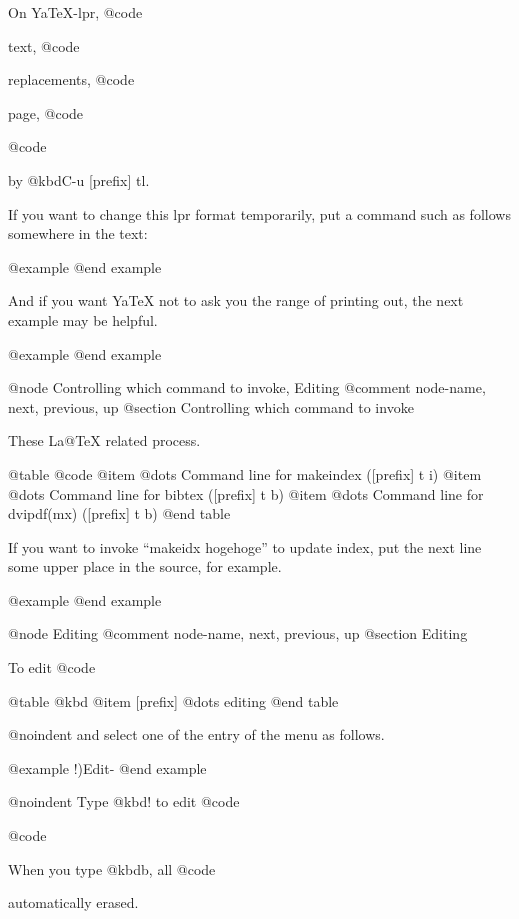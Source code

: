 {{{{{{{{{{{{{{{{{  On YaTeX-lpr, @code{%
text, @code{%
replacements, @code{%
page, @code{%
@code{%
by @kbd{C-u [prefix] tl}.

  If you want to change this lpr format temporarily, put a command
such as follows somewhere in the text:

@example
@end example

  And if you want YaTeX not to ask you the range of printing
out, the next example may be helpful.

@example
@end example

@node Controlling which command to invoke, Editing %
@comment  node-name,  next,  previous,  up
@section Controlling which command to invoke

These %
La@TeX{} related process.

@table @code
 @item %
	@dots{} Command line for makeindex ([prefix] t i)
 @item %
	@dots{} Command line for bibtex ([prefix] t b)
 @item %
	@dots{} Command line for dvipdf(mx) ([prefix] t b)
@end table

If you want to invoke ``makeidx hogehoge'' to update index,
put the next line some upper place in the source, for example.

@example
@end example


@node Editing %
@comment  node-name,  next,  previous,  up
@section Editing %

  To edit @code{%

@table @kbd
@item [prefix] %
        @dots{} editing %
@end table

@noindent
and select one of the entry of the menu as follows.

@example
        !)Edit-%
@end example

@noindent
Type @kbd{!} to edit @code{%
@code{%
When you type @kbd{b}, all @code{%
automatically erased.

}}}}}}}}}}}}}}}}}}}}}}}}}}

